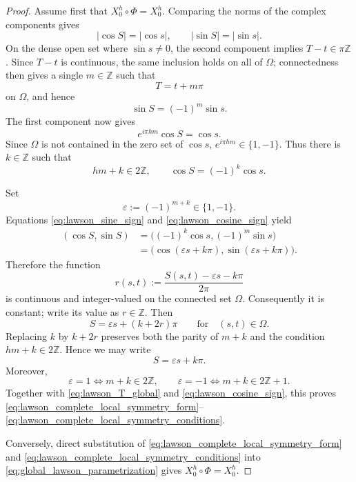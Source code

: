 \documentclass[a4paper,11pt]{amsart}
\numberwithin{equation}{section}
\theoremstyle{plain}
\begin{document}
\begin{proof}
Assume first that $X_0^h\circ\Phi=X_0^h$. Comparing the norms of the
complex components gives
\[
|\cos S|=|\cos s|,
\qquad
|\sin S|=|\sin s|.
\]
On the dense open set where $\sin s\neq0$, the second component implies
$T-t\in\pi\mathbb Z$. Since $T-t$ is continuous, the same inclusion holds
on all of $\Omega$; connectedness then gives a single $m\in\mathbb Z$ such
that
\begin{equation}\label{eq:lawson_T_global}
T=t+m\pi
\end{equation}
on $\Omega$, and hence
\begin{equation}\label{eq:lawson_sine_sign}
\sin S=(-1)^m\sin s.
\end{equation}
The first component now gives
\[
e^{i\pi hm}\cos S=\cos s.
\]
Since $\Omega$ is not contained in the zero set of $\cos s$,
$e^{i\pi hm}\in\{1,-1\}$. Thus there is $k\in\mathbb Z$ such that
\begin{equation}\label{eq:lawson_cosine_sign}
hm+k\in2\mathbb Z,
\qquad
\cos S=(-1)^k\cos s.
\end{equation}

Set
\[
\varepsilon:=(-1)^{m+k}\in\{1,-1\}.
\]
Equations \eqref{eq:lawson_sine_sign} and
\eqref{eq:lawson_cosine_sign} yield
\[
\begin{aligned}
(\cos S,\sin S)
&=
\bigl((-1)^k\cos s,(-1)^m\sin s\bigr)\\
&=
\bigl(\cos(\varepsilon s+k\pi),
      \sin(\varepsilon s+k\pi)\bigr).
\end{aligned}
\]
Therefore the function
\[
r(s,t)
:=
\frac{S(s,t)-\varepsilon s-k\pi}{2\pi}
\]
is continuous and integer-valued on the connected set $\Omega$.
Consequently it is constant; write its value as $r\in\mathbb Z$. Then
\[
S=\varepsilon s+(k+2r)\pi
\qquad\text{for}\quad (s,t)\in\Omega.
\]
Replacing $k$ by $k+2r$ preserves both the parity of $m+k$ and the
condition $hm+k\in2\mathbb Z$. Hence we may write
\[
S=\varepsilon s+k\pi.
\]
Moreover,
\[
\varepsilon=1
\iff m+k\in2\mathbb Z,
\qquad
\varepsilon=-1
\iff m+k\in2\mathbb Z+1.
\]
Together with \eqref{eq:lawson_T_global} and
\eqref{eq:lawson_cosine_sign}, this proves
\eqref{eq:lawson_complete_local_symmetry_form}--
\eqref{eq:lawson_complete_local_symmetry_conditions}.

Conversely, direct substitution of
\eqref{eq:lawson_complete_local_symmetry_form} and
\eqref{eq:lawson_complete_local_symmetry_conditions} into
\eqref{eq:global_lawson_parametrization} gives
$X_0^h\circ\Phi=X_0^h$.
\end{proof}
\end{document}
